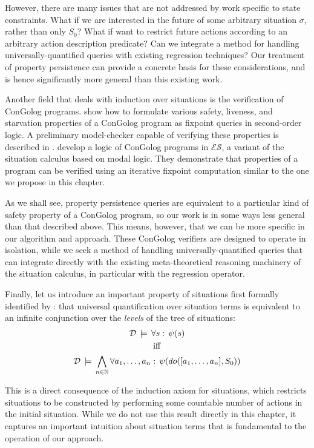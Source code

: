 However, there are many issues that are not addressed by work specific
to state constraints. What if we are interested in the future of some
arbitrary situation $\sigma$, rather than only $S_{0}$? What if
want to restrict future actions according to an arbitrary action description
predicate? Can we integrate a method for handling universally-quantified
queries with existing regression techniques? Our treatment of property
persistence can provide a concrete basis for these considerations,
and is hence significantly more general than this existing work.

Another field that deals with induction over situations is the verification
of ConGolog programs. \citet{ternovska97congolog_fixpoint} show how
to formulate various safety, liveness, and starvation properties of
a ConGolog program as fixpoint queries in second-order logic. A preliminary
model-checker capable of verifying these properties is described in
\citep{ternovska02congolog_model_checker}. \citet{classen08golog_properties}
develop a logic of ConGolog programs in $\mathcal{ES}$, a variant
of the situation calculus based on modal logic. They demonstrate that
properties of a program can be verified using an iterative fixpoint
computation similar to the one we propose in this chapter.

As we shall see, property persistence queries are equivalent to a
particular kind of safety property of a ConGolog program, so our work
is in some ways less general than that described above. This means,
however, that we can be more specific in our algorithm and approach.
These ConGolog verifiers are designed to operate in isolation, while
we seek a method of handling universally-quantified queries that can
integrate directly with the existing meta-theoretical reasoning machinery
of the situation calculus, in particular with the regression operator.

Finally, let us introduce an important property of situations first
formally identified by \citet{savelli06sc_quantum_levels}: that universal
quantification over situation terms is equivalent to an infinite conjunction
over the \emph{levels} of the tree of situations:\begin{gather*}
\mathcal{D}\,\models\,\forall s:\,\psi(s)\\
\mathrm{iff}\\
\mathcal{D}\,\models\,\bigwedge_{n\in\mathbb{N}}\forall a_{1},\dots,a_{n}:\,\psi(do([a_{1},\dots,a_{n}],S_{0}))\end{gather*}


This is a direct consequence of the induction axiom for situations,
which restricts situations to be constructed by performing some countable
number of actions in the initial situation. While we do not use this
result directly in this chapter, it captures an important intuition
about situation terms that is fundamental to the operation of our
approach.


